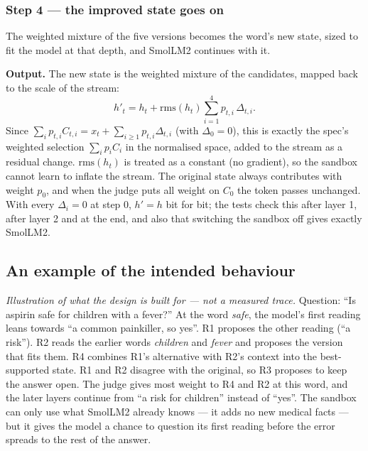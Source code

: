 \documentclass[a4paper,12pt,parskip=half,headsepline]{scrartcl}
\begin{document}
\subsubsection*{Step 4 --- the improved state goes on}

\begin{plain}
The weighted mixture of the five versions becomes the word's new state, sized to fit
the model at that depth, and SmolLM2 continues with it.
\end{plain}

\begin{tech}
\textbf{Output.} The new state is the weighted mixture of the candidates, mapped back to
the scale of the stream:
\[
h'_t = h_t + \text{rms}(h_t)\sum_{i=1}^{4} p_{t,i}\,\Delta_{t,i}.
\]
Since $\sum_i p_{t,i} C_{t,i} = x_t + \sum_{i \ge 1} p_{t,i}\Delta_{t,i}$ (with $\Delta_0 = 0$),
this is exactly the spec's weighted selection $\sum_i p_i C_i$ in the normalised space,
added to the stream as a residual change. $\text{rms}(h_t)$ is treated as a constant
(no gradient), so the sandbox cannot learn to inflate the stream. The original state
always contributes with weight $p_0$, and when the judge puts all weight on $C_0$ the
token passes unchanged. With every $\Delta_i = 0$ at step 0, $h' = h$ bit for bit; the tests
check this after layer 1, after layer 2 and at the end, and also that switching the
sandbox off gives exactly SmolLM2.
\end{tech}

\subsection{An example of the intended behaviour}

\begin{plain}
\emph{Illustration of what the design is built for --- not a measured trace.}
Question: ``Is aspirin safe for children with a fever?'' At the word \emph{safe}, the
model's first reading leans towards ``a common painkiller, so yes''. R1 proposes the
other reading (``a risk''). R2 reads the earlier words \emph{children} and
\emph{fever} and proposes the version that fits them. R4 combines R1's alternative
with R2's context into the best-supported state. R1 and R2 disagree with the
original, so R3 proposes to keep the answer open. The judge gives most weight to R4
and R2 at this word, and the later layers continue from ``a risk for children''
instead of ``yes''. The sandbox can only use what SmolLM2 already knows --- it adds
no new medical facts --- but it gives the model a chance to question its first
reading before the error spreads to the rest of the answer.
\end{plain}
\end{document}
